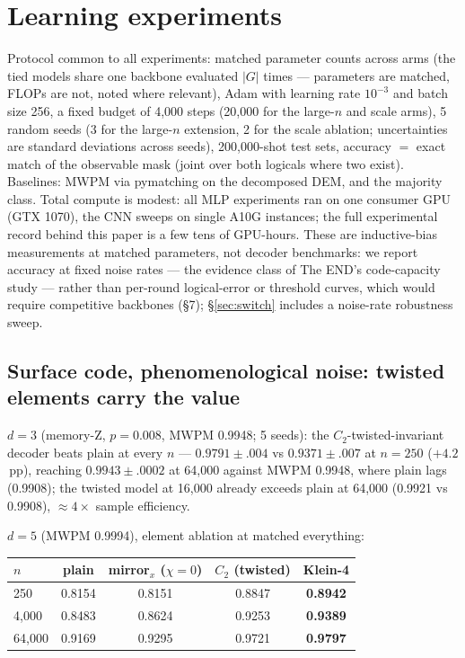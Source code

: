 \documentclass[11pt]{article}
\begin{document}
\section{Learning experiments}

Protocol common to all experiments: matched parameter counts across arms
(the tied models share one backbone evaluated $|G|$ times --- parameters are
matched, FLOPs are not, noted where relevant), Adam with learning rate
$10^{-3}$ and batch size 256, a fixed budget of 4{,}000 steps (20{,}000 for
the large-$n$ and scale arms), 5 random seeds (3 for the large-$n$
extension, 2 for the scale ablation; uncertainties are standard deviations
across seeds), 200{,}000-shot test sets, accuracy $=$ exact match of the
observable mask (joint over both logicals where two exist). Baselines: MWPM
via pymatching on the decomposed DEM, and the majority class. Total compute
is modest: all MLP experiments ran on one consumer GPU (GTX 1070), the CNN
sweeps on single A10G instances; the full experimental record behind this
paper is a few tens of GPU-hours. These are inductive-bias measurements at
matched parameters, not decoder benchmarks: we report accuracy at fixed
noise rates --- the evidence class of The END's code-capacity study
\cite{Egorov23} --- rather than per-round logical-error or threshold
curves, which would require competitive backbones (\S7); \S\ref{sec:switch}
includes a noise-rate robustness sweep.

\subsection{Surface code, phenomenological noise: twisted elements carry
the value}
\label{sec:surface}

$d = 3$ (memory-Z, $p = 0.008$, MWPM 0.9948; 5 seeds): the
$C_2$-twisted-invariant decoder beats plain at every $n$ ---
$0.9791 \pm .004$ vs $0.9371 \pm .007$ at $n = 250$ ($+4.2$\,pp), reaching
$0.9943 \pm .0002$ at 64{,}000 against MWPM 0.9948, where plain lags
(0.9908); the twisted model at 16{,}000 already exceeds plain at 64{,}000
(0.9921 vs 0.9908), $\approx 4\times$ sample efficiency.

$d = 5$ (MWPM 0.9994), element ablation at matched everything:

\begin{center}
\begin{tabular}{lcccc}
\toprule
$n$ & plain & mirror$_x$ ($\chi{=}0$) & $C_2$ (twisted) & Klein-4 \\
\midrule
250 & 0.8154 & 0.8151 & 0.8847 & \textbf{0.8942} \\
4{,}000 & 0.8483 & 0.8624 & 0.9253 & \textbf{0.9389} \\
64{,}000 & 0.9169 & 0.9295 & 0.9721 & \textbf{0.9797} \\
\bottomrule
\end{tabular}
\end{center}
\end{document}
